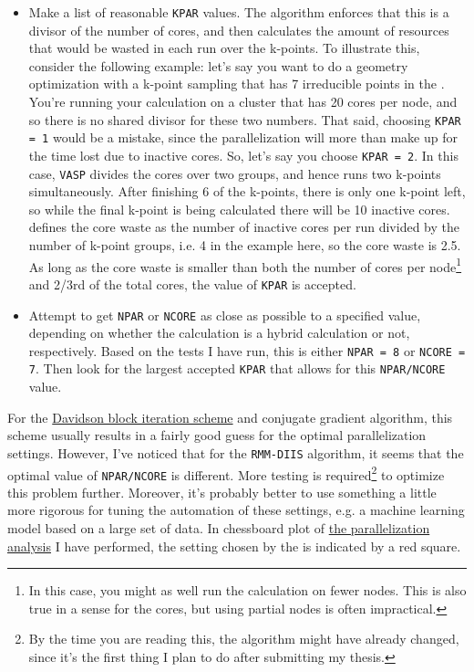 \begin{refsection}
\begin{itemize}

\item Make a list of reasonable \texttt{KPAR} values. The algorithm enforces that this is a divisor of the number of cores, and then calculates the amount of resources that would be wasted in each run over the k-points. To illustrate this, consider the following example: let's say you want to do a geometry optimization with a k-point sampling that has 7 irreducible points in the . You're running your calculation on a cluster that has 20 cores per node, and so there is no shared divisor for these two numbers. That said, choosing \texttt{KPAR = 1} would be a mistake, since the parallelization will more than make up for the time lost due to inactive cores. So, let's say you choose \texttt{KPAR = 2}. In this case, \texttt{VASP} divides the cores over two groups, and hence runs two k-points simultaneously. After finishing 6 of the k-points, there is only one k-point left, so while the final k-point is being calculated there will be 10 inactive cores.  defines the core waste as the number of inactive cores per run divided by the number of k-point groups, i.e. 4 in the example here, so the core waste is 2.5. As long as the core waste is smaller than both the number of cores per node\footnote{In this case, you might as well run the calculation on fewer nodes. This is also true in a sense for the cores, but using partial nodes is often impractical.} and 2/3rd of the total cores, the value of \texttt{KPAR} is accepted.

\item Attempt to get \texttt{NPAR} or \texttt{NCORE} as close as possible to a specified value, depending on whether the calculation is a hybrid calculation or not, respectively. Based on the tests I have run, this is either \texttt{NPAR = 8} or \texttt{NCORE = 7}. Then look for the largest accepted \texttt{KPAR} that allows for this \texttt{NPAR/NCORE} value.

\end{itemize}

For the \href{https://joshuagoings.com/2013/08/23/davidsons-method/}{Davidson block iteration scheme} and conjugate gradient algorithm, this scheme usually results in a fairly good guess for the optimal parallelization settings. However, I've noticed that for the \texttt{RMM-DIIS} algorithm, it seems that the optimal value of \texttt{NPAR/NCORE} is different. More testing is required\footnote{By the time you are reading this, the algorithm might have already changed, since it's the first thing I plan to do after submitting my thesis.} to optimize this problem further. Moreover, it's probably better to use something a little more rigorous for tuning the automation of these settings, e.g. a machine learning model based on a large set of data. In chessboard plot of \href{https://mybinder.org/v2/gh/mbercx/jupyter/master?filepath=parallel\%2Fparallel_analysis.ipynb}{the parallelization analysis} I have performed, the setting chosen by the  is indicated by a red square.


\end{refsection}
